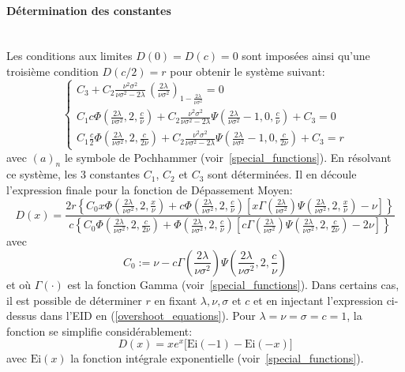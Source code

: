 \paragraph{Détermination des constantes}\phantom{}\\
Les conditions aux limites \(D(0)=D(c)=0\) sont imposées ainsi qu'une troisième condition \(D(c/2)=r\) pour obtenir le système suivant:
\[
\begin{cases}
    C_3+C_2\frac{ \nu^2\sigma^2  }{\nu  \sigma ^2-2 \lambda}\,{\left(\frac{2 \lambda }{\nu  \sigma ^2}\right)}_{1-\frac{2 \lambda }{\nu  \sigma ^2}}=0\\
    C_1c \Phi\left(\frac{2 \lambda }{\nu \sigma^2},2,\frac{c}{\nu }\right)+C_2 \frac{\nu^2\sigma^2}{\nu\sigma^2-2\lambda}\Psi\left(\frac{2 \lambda }{\nu \sigma^2}-1,0,\frac{c}{\nu }\right)+C_3=0\\
    C_1 \frac{c}{2} \Phi\left(\frac{2 \lambda }{\nu \sigma^2},2,\frac{c}{2\nu }\right)+C_2 \frac{\nu^2\sigma^2}{\nu\sigma^2-2\lambda}\Psi\left(\frac{2 \lambda }{\nu \sigma^2}-1,0,\frac{c}{2\nu }\right)+C_3=r
\end{cases}
\]
avec \({(a)}_n\) le symbole de Pochhammer (voir~\ref{special_functions}). En résolvant ce système, les 3 constantes $C_1$, $C_2$ et $C_3$ sont déterminées. Il en découle l'expression finale pour la fonction de Dépassement Moyen:
\begin{equation}\label{overshoot_exact_sol}
    D(x)=\frac{2 r \left\{C_0 x \Phi\left(\frac{2 \lambda }{\nu  \sigma ^2},2,\frac{x}{\nu }\right) +c \Phi\left(\frac{2 \lambda }{\nu  \sigma ^2},2,\frac{c}{\nu }\right) \left[x \Gamma \left(\frac{2 \lambda }{\nu  \sigma ^2}\right) \Psi\left(\frac{2 \lambda }{\nu  \sigma ^2},2,\frac{x}{\nu }\right)-\nu \right]\right\}}{c \left\{C_0\Phi\left(\frac{2 \lambda }{\nu  \sigma ^2},2,\frac{c}{2 \nu }\right)+\Phi\left(\frac{2 \lambda }{\nu  \sigma ^2},2,\frac{c}{\nu }\right) \left[c \Gamma \left(\frac{2 \lambda }{\nu  \sigma ^2}\right) \Psi\left(\frac{2 \lambda }{\nu  \sigma ^2},2,\frac{c}{2 \nu }\right)-2 \nu \right]\right\}}
\end{equation}
avec 
\[
C_0:=\nu -c \Gamma \left(\frac{2 \lambda }{\nu  \sigma ^2}\right) \Psi\left(\frac{2 \lambda }{\nu  \sigma ^2},2,\frac{c}{\nu }\right)
\]
et où \(\Gamma(\cdot)\) est la fonction Gamma (voir~\ref{special_functions}).
Dans certains cas, il est possible de déterminer $r$ en fixant \(\lambda,\nu,\sigma\) et $c$ et en injectant l'expression ci-dessus dans l'\acs{EID} en (\ref{overshoot_equations}). Pour \(\lambda=\nu=\sigma=c=1\), la fonction se simplifie considérablement:
\[
D(x)=xe^x\big[\text{Ei}(-1)-\text{Ei}(-x)\big]
\]
avec $\text{Ei}(x)$ la fonction intégrale exponentielle (voir~\ref{special_functions}).

